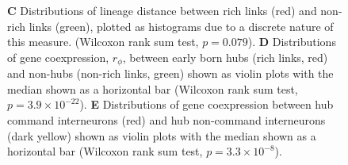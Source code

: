 \documentclass[10pt,letterpaper]{article}
\begin{document}
{\begin{figure}[!h]
{%
\textbf{C} Distributions of lineage distance between rich links (red) and non-rich links (green), plotted as histograms due to a discrete nature of this measure. (Wilcoxon rank sum test, $p = 0.079$).
\textbf{D} Distributions of gene coexpression, $r_\phi$, between early born hubs (rich links, red) and non-hubs (non-rich links, green) shown as violin plots with the median shown as a horizontal bar (Wilcoxon rank sum test, $p = 3.9 \times 10^{-22}$).
\textbf{E} Distributions of gene coexpression between hub command interneurons (red) and hub non-command interneurons (dark yellow) shown as violin plots with the median shown as a horizontal bar (Wilcoxon rank sum test, $p = 3.3 \times 10^{-8}$).
}
 \label{fig:OtherInfluences}
\end{figure}


}
\end{document}

